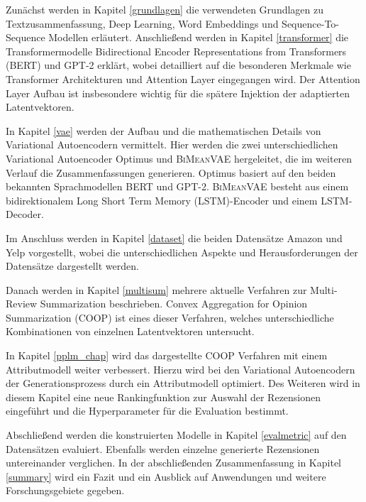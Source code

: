 \pagebreak
Zunächst werden in Kapitel \ref{grundlagen} die verwendeten Grundlagen zu Textzusammenfassung, Deep Learning, Word Embeddings und Sequence-To-Sequence Modellen erläutert.
Anschließend werden in Kapitel \ref{transformer} die Transformermodelle Bidirectional Encoder Representations from Transformers (BERT) und GPT-2 erklärt, wobei detailliert auf die besonderen Merkmale wie Transformer Architekturen und Attention Layer eingegangen wird.
Der Attention Layer Aufbau ist insbesondere wichtig für die spätere Injektion der adaptierten Latentvektoren.

In Kapitel \ref{vae} werden der Aufbau und die mathematischen Details von Variational Autoencodern vermittelt.
Hier werden die zwei unterschiedlichen Variational Autoencoder Optimus und \textsc{BiMeanVAE} hergeleitet, die im weiteren Verlauf die Zusammenfassungen generieren.
Optimus basiert auf den beiden bekannten Sprachmodellen BERT und GPT-2. 
\textsc{BiMeanVAE} besteht aus einem bidirektionalem Long Short Term Memory (LSTM)-Encoder und einem LSTM-Decoder.

Im Anschluss werden in Kapitel \ref{dataset} die beiden Datensätze Amazon und Yelp vorgestellt, wobei die unterschiedlichen Aspekte und Herausforderungen der Datensätze dargestellt werden.

Danach werden in Kapitel \ref{multisum} mehrere aktuelle Verfahren zur Multi-Review Summarization beschrieben. 
Convex Aggregation for Opinion Summarization (COOP) ist eines dieser Verfahren, welches unterschiedliche Kombinationen von einzelnen Latentvektoren untersucht.

In Kapitel \ref{pplm_chap} wird das dargestellte COOP Verfahren mit einem Attributmodell weiter verbessert. 
Hierzu wird bei den Variational Autoencodern der Generationsprozess durch ein Attributmodell optimiert.
Des Weiteren wird in diesem Kapitel eine neue Rankingfunktion zur Auswahl der Rezensionen eingeführt und die Hyperparameter für die Evaluation bestimmt.

Abschließend werden die konstruierten Modelle in Kapitel \ref{evalmetric} auf den Datensätzen evaluiert. Ebenfalls werden einzelne generierte Rezensionen untereinander verglichen.
In der abschließenden Zusammenfassung in Kapitel \ref{summary} wird ein Fazit und ein Ausblick auf Anwendungen und weitere Forschungsgebiete gegeben.  






